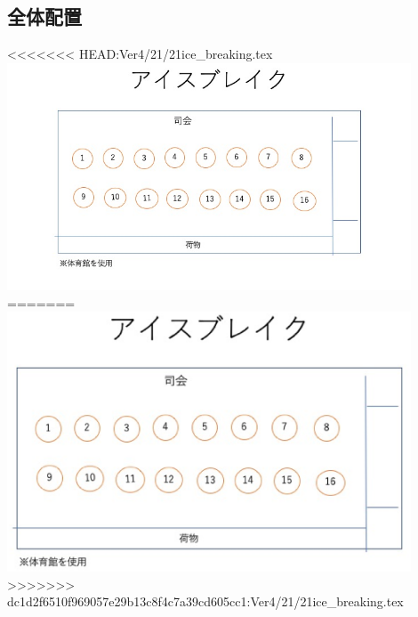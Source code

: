 \subsection{全体配置}
\begin{center}
<<<<<<< HEAD:Ver4/21/21ice_breaking.tex
\includegraphics[width=12cm]{./21/reiout1.eps}
=======
\includegraphics[width=12cm]{./21/reiout.eps}
>>>>>>> dc1d2f6510f969057e29b13c8f4c7a39cd605cc1:Ver4/21/21ice_breaking.tex
\end{center}
